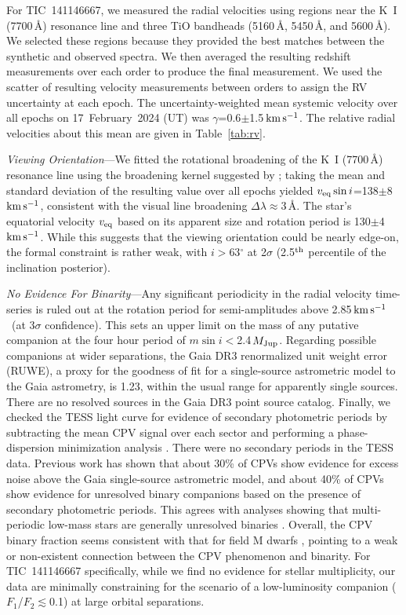 \documentclass{nature3}
\newcommand{\kms}{\ensuremath{\rm km\,s^{-1}}}
\begin{document}
\begin{methods}
For TIC~141146667, we measured the radial velocities using regions
near the K~I (7700\,\AA) resonance line and three TiO bandheads
(5160\,\AA, 5450\,\AA, and 5600\,\AA).  We
selected these regions because they provided the best matches between the
synthetic and observed spectra.  We then averaged the resulting redshift measurements
over each order to produce the final measurement.  We used
the scatter of resulting velocity measurements between orders to assign
the RV uncertainty at each epoch.  The uncertainty-weighted mean
systemic velocity over all epochs on 17~February~2024 (UT) was
$\gamma$=0.6$\pm$1.5\,\kms.  The relative radial velocities about this
mean are given in Table~\ref{tab:rv}.

{\it Viewing Orientation}---We fitted the rotational broadening of the
K~I (7700\,\AA) resonance line using the broadening kernel suggested by
\cite{Gray2008}; taking the mean and standard deviation of the
resulting value over all epochs yielded $v_{\rm eq} \sin
i$=138$\pm$8\,\kms, consistent with the visual line broadening $\Delta
\lambda$$\approx$3\,\AA.  The star's equatorial velocity $v_{\rm eq}$
based on its apparent size and rotation period is 130$\pm$4\,\kms.
While this suggests that the viewing orientation could be nearly
edge-on, the formal constraint is rather weak, with $i$$>$63$^\circ$ at
2$\sigma$ (2.5$^{\rm th}$ percentile of the inclination posterior).

{\it No Evidence For Binarity}---Any significant periodicity in the
radial velocity time-series is ruled out at the rotation period for
semi-amplitudes above 2.85\,\kms\ (at 3$\sigma$ confidence).  This
sets an upper limit on the mass of any putative companion at the four
hour period of $m \sin i $$<$2.4\,$M_{\rm Jup}$.  Regarding possible
companions at wider separations, the Gaia DR3 renormalized unit weight
error (RUWE), a proxy for the goodness of fit for a single-source
astrometric model to the Gaia astrometry, is 1.23, within the
usual range for apparently single sources.  There are no resolved
sources in the Gaia DR3 point source catalog.  Finally, we checked the
TESS light curve for evidence of secondary photometric periods by
subtracting the mean CPV signal over each sector and performing a
phase-dispersion minimization analysis
\cite{Stellingwerf1978,2021zndo...1011188B}.  There were no secondary
periods in the TESS data.  Previous work \cite{Bouma2024} has shown
that about 30\% of CPVs show evidence for excess noise above the Gaia
single-source astrometric model, and about 40\% of CPVs show evidence
for unresolved binary companions based on the presence of secondary
photometric periods.  This agrees with analyses showing that
multi-periodic low-mass stars are generally unresolved binaries
\cite{Tokovinin2018}.  Overall, the CPV binary fraction seems
consistent with that for field M dwarfs \cite{Winters2019},
pointing to a weak or non-existent connection between the CPV
phenomenon and binarity.  For TIC~141146667 specifically, while we find 
no evidence for stellar multiplicity, our data are minimally
constraining for the scenario of a low-luminosity companion
($F_1$/$F_2$$\lesssim$0.1) at large orbital separations.



\end{methods}
\end{document}
